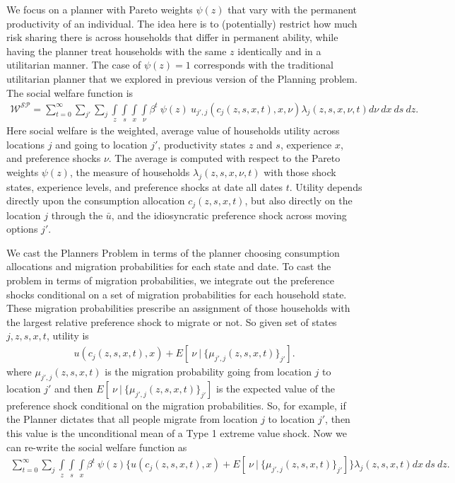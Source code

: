 \documentclass[12pt,pdftex]{article}
\begin{document}
\begin{onehalfspacing}
We focus on a planner with Pareto weights $\psi(z)$ that vary with the permanent productivity of an individual. The idea here is to (potentially) restrict how much risk sharing there is across households that differ in permanent ability, while having the planner treat households with the same $z$ identically and in a utilitarian manner. The case of $\psi(z) = 1$ corresponds with the traditional utilitarian planner that we explored in previous version of the Planning problem. The social welfare function is
\begin{align}
\mathcal{W^{SP}} = \sum_{t=0}^{\infty} \sum_{j'} \sum_{j} \int\limits_{z} \int\limits_{s} \int\limits_{x} \int\limits_{\nu} \beta^{t} \ \psi(z) \ u_{j',j}(c_{j}(z, s, x, t), x, \nu) \lambda_{j}(z, s, x, \nu, t) d\nu \ dx \ ds \ dz.
\label{appendix-eq:sp-social_welfare}
\end{align}
Here social welfare is the weighted, average value of households utility across locations $j$ and going to location $j'$,  productivity states $z$ and $s$, experience $x$, and preference shocks $\nu$. The average is computed with respect to the Pareto weights $\psi(z)$, the measure of households $\lambda_{j}(z, s, x, \nu, t)$ with those shock states, experience levels, and preference shocks at date all dates $t$. Utility depends directly upon the consumption allocation $c_{j}(z, s, x, t)$, but also directly on the location $j$ through the $\bar u$, and the idiosyncratic preference shock across moving options $j'$.

We cast the Planners Problem in terms of the planner choosing consumption allocations and migration probabilities for each state and date. To cast the problem in terms of migration probabilities, we integrate out the preference shocks conditional on a set of migration probabilities for each household state. These migration probabilities prescribe an assignment of those households with the largest relative preference shock to migrate or not. So given set of states $j, z, s, x, t$, utility is
\begin{align}
u(c_{j}(z,s, x, t), x) + E[ \ \nu \ | \ \big\{\mu_{j',j}(z,s,x,t)\big\}_{j'} ].
\label{appendix-eq:utility-shocks}
\end{align}
where $\mu_{j',j}(z,s,x,t)$ is the migration probability going from location $j$ to location $j'$ and then $E[ \ \nu \ | \ \big\{\mu_{j',j}(z,s,x,t)\big\}_{j'} ]$ is the expected value of the preference shock conditional on the migration probabilities. So, for example, if the Planner dictates that all people migrate from location $j$ to location $j'$, then this value is the unconditional mean of a Type 1 extreme value shock. Now we can re-write the social welfare function as
\begin{align}
\sum_{t=0}^{\infty}\sum_{j} \int\limits_{z} \int\limits_{s} \int\limits_{x} \beta^{t} \ \psi(z) \bigg \{ u(c_{j}(z, s, x, t), x) + E[ \ \nu \ | \ \big\{\mu_{j',j}(z, s,x,t)\big\}_{j'}] \bigg \} \lambda_{j}(z, s, x, t) dx \ ds \ dz.
\label{appendix-eq:sp-social_welfare2}
\end{align}


\end{onehalfspacing}
\end{document}
